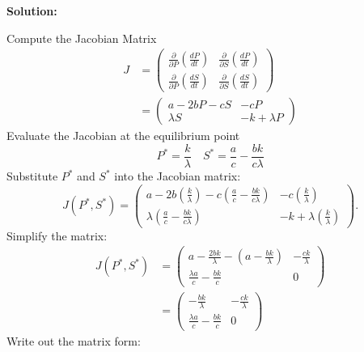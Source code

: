 \documentclass[12pt]{article}
\newenvironment{solution}{
    \textbf{Solution:}
    
}{
    
    \vspace{2em}
}
\begin{document}
\begin{solution}
\begin{enumerate}
        Compute the Jacobian Matrix
        \[
            \begin{aligned}
                J &= \begin{pmatrix}
                    \frac{\partial}{\partial P}\left(\frac{dP}{dt}\right) & \frac{\partial}{\partial S} \left(\frac{dP}{dt}\right) \\
                    \frac{\partial}{\partial P} \left(\frac{dS}{dt}\right) & \frac{\partial}{\partial S} \left(\frac{dS}{dt}\right)
                \end{pmatrix}\\
                &= \begin{pmatrix}
                    a - 2bP - cS & -cP \\
                    \lambda S & -k + \lambda P
                \end{pmatrix}
            \end{aligned}
        \]
        Evaluate the Jacobian at the equilibrium point
        \[
            P^* = \frac{k}{\lambda} \quad S^* = \frac{a}{c} - \frac{bk}{c\lambda}
        \]
        Substitute \( P^* \) and \( S^* \) into the Jacobian matrix:
        \[
            J(P^*, S^*) = \begin{pmatrix}
                a - 2b\left(\frac{k}{\lambda}\right) - c\left(\frac{a}{c} - \frac{bk}{c\lambda}\right) & -c\left(\frac{k}{\lambda}\right) \\
                \lambda\left(\frac{a}{c} - \frac{bk}{c\lambda}\right) & -k + \lambda\left(\frac{k}{\lambda}\right)
            \end{pmatrix}.
        \]
        Simplify the matrix:
        \[
            \begin{aligned}
                J(P^*, S^*) &= \begin{pmatrix}
                    a - \frac{2bk}{\lambda} - \left(a - \frac{bk}{\lambda}\right) & -\frac{ck}{\lambda} \\
                    \frac{\lambda a}{c} - \frac{bk}{c} & 0
                \end{pmatrix}\\
                &= \begin{pmatrix}
                    -\frac{bk}{\lambda} & -\frac{ck}{\lambda} \\
                    \frac{\lambda a}{c} - \frac{bk}{c} & 0
                \end{pmatrix}
            \end{aligned}
        \]
        Write out the matrix form:
        \[
\]
\end{enumerate}
\end{solution}
\end{document}
